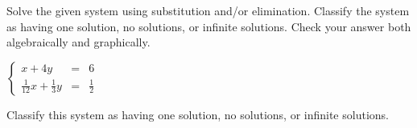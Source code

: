 \documentclass{ximera}
\author{Elizabeth Miller}
\begin{document}
\licenseSZ

Solve the given system using substitution and/or elimination. Classify the system as having one solution, no solutions, or infinite solutions. Check your answer both algebraically and graphically.

$\left\{ \begin{array}{rcr} x+4y & = & 6  \\ [5pt] \frac{1}{12}x+\frac{1}{3}y& = & \frac{1}{2}  \end{array} \right.$ 

\begin{exercise}
Classify this system as having one solution, no solutions, or infinite solutions.
\begin{multipleChoice}  
\end{multipleChoice}  
\end{exercise}
\end{document}
